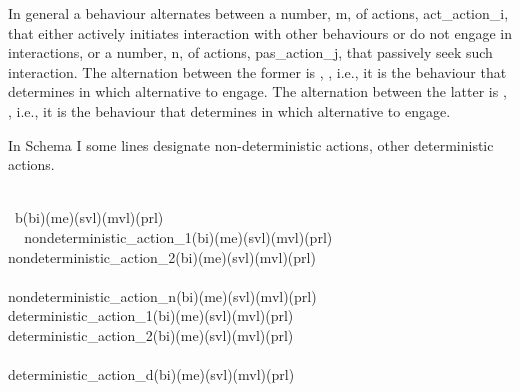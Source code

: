 
\noindent
\begynd
\pind In general a \textsf{behaviour} alternates between
\begynd
\pind a number, \textsf{m}, of actions, \textsf{act\_action\_i}, that
      either actively initiates 
      interaction with other behaviours or do not engage in interactions, or
\pind a number, \textsf{n}, of actions, \textsf{pas\_action\_j}, that
      passively seek such interaction.
\afslut
\pind The alternation between the former is , {\NONDETCHOICE}, i.e., it is the
      \textsf{behaviour} that determines in which alternative to engage.
\pind The alternation between the latter is , {\DETCHOICE}, i.e., it is the
      \textsf{behaviour} that determines in which alternative to engage.
\afslut
\mnewfoil


\begynd
\pind In Schema I
\begynd
\pind some lines designate non-deterministic actions,
\pind other deterministic actions.
\afslut
\afslut
\afslut


\bp
{}\\
\>\ b(bi)(me)(svl)(mvl)(prl) {\IS}\\
\>\>\ \,\,\,\,non{\MINUS}deterministic\_action\_1(bi)(me)(svl)(mvl)(prl)\\
\>\>{\NONDETCHOICE} non{\MINUS}deterministic\_action\_2(bi)(me)(svl)(mvl)(prl)\\
\>\>\>\ {\DOTDOTDOT}\\
\>\>{\NONDETCHOICE} non{\MINUS}deterministic\_action\_n(bi)(me)(svl)(mvl)(prl)\\
\>\>{\DETCHOICE} deterministic\_action\_1(bi)(me)(svl)(mvl)(prl)\\
\>\>{\DETCHOICE} deterministic\_action\_2(bi)(me)(svl)(mvl)(prl)\\
\>\>\>\ {\DOTDOTDOT}\\
\>\>{\DETCHOICE} deterministic\_action\_d(bi)(me)(svl)(mvl)(prl)
\ep


